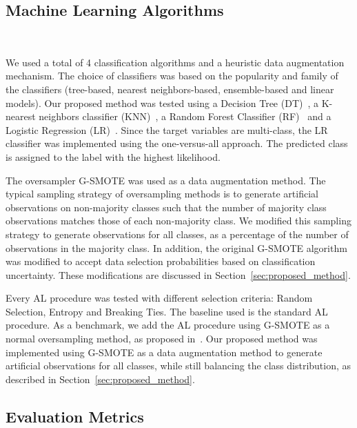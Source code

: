 \documentclass[parskip=full]{scrartcl}
\begin{document}
\subsection{Machine Learning Algorithms}~\label{sec:machine_learning_algorithms}

We used a total of 4 classification algorithms and a heuristic data
augmentation mechanism. The choice of classifiers was based on the popularity
and family of the classifiers (tree-based, nearest neighbors-based,
ensemble-based and linear models). Our proposed method was tested using a
Decision Tree (DT)~\cite{Wu1975}, a K-nearest neighbors classifier
(KNN)~\cite{Cover1967}, a Random Forest Classifier (RF)~\cite{Ho1995} and a
Logistic Regression (LR)~\cite{Nelder1972}. Since the target variables are
multi-class, the LR classifier was implemented using the one-versus-all
approach. The predicted class is assigned to the label with the highest
likelihood.

The oversampler G-SMOTE was used as a data augmentation method. The typical
sampling strategy of oversampling methods is to generate artificial
observations on non-majority classes such that the number of majority class
observations matches those of each non-majority class. We modified this
sampling strategy to generate observations for all classes, as a percentage of
the number of observations in the majority class. In addition, the original
G-SMOTE algorithm was modified to accept data selection probabilities based on
classification uncertainty. These modifications are discussed in
Section~\ref{sec:proposed_method}.

Every AL procedure was tested with different selection criteria: Random
Selection, Entropy and Breaking Ties. The baseline used is the standard AL
procedure. As a benchmark, we add the AL procedure using G-SMOTE as a normal
oversampling method, as proposed in~\cite{Fonseca2021}. Our proposed method
was implemented using G-SMOTE as a data augmentation method to generate
artificial observations for all classes, while still balancing the class
distribution, as described in Section~\ref{sec:proposed_method}. 

\subsection{Evaluation Metrics}~\label{sec:evaluation_metrics}
\end{document}
